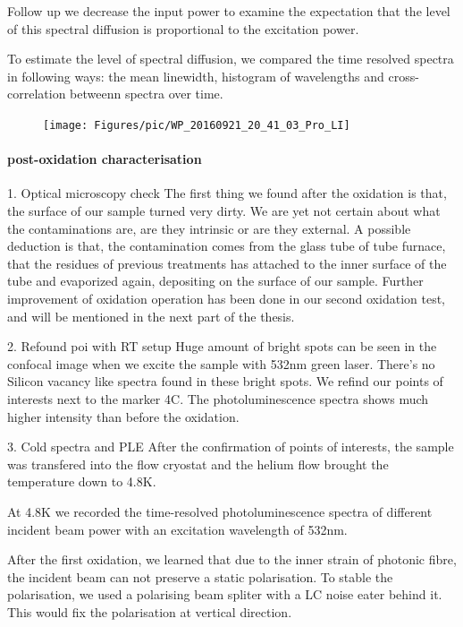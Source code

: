 Follow up we decrease the input power to examine the expectation that the level of this spectral diffusion is proportional to the excitation power.

To estimate the level of spectral diffusion, we compared the time resolved spectra in following ways: the mean linewidth, histogram of wavelengths and cross-correlation betweenn spectra over time.



\FloatBarrier
\begin{figure}[h]
\centering
\texttt{[image: Figures/pic/WP\_20160921\_20\_41\_03\_Pro\_LI]}
\caption{}
\label{fig:wp20160921204103proli}
\end{figure}
\FloatBarrier
\paragraph{post-oxidation characterisation}
1. Optical microscopy check
The first thing we found after the oxidation is that, the surface of our sample turned very dirty. We are yet not certain about what the contaminations are, are they intrinsic or are they external. A possible deduction is that, the contamination comes from the glass tube of tube furnace, that the residues of previous treatments has attached to the inner surface of the tube and evaporized again, depositing on the surface of our sample. Further improvement of oxidation operation has been done in our second oxidation test, and will be mentioned in the next part of the thesis.


2. Refound poi with RT setup
Huge amount of bright spots can be seen in the confocal image when we excite the sample with 532nm green laser. There's no Silicon vacancy like spectra found in these bright spots. We refind our points of interests next to the marker 4C. The photoluminescence spectra shows much higher intensity than before the oxidation.


3. Cold spectra and PLE 
After the confirmation of points of interests, the sample was transfered into the flow cryostat and the helium flow brought the temperature down to 4.8K.

At 4.8K we recorded the time-resolved photoluminescence spectra of different incident beam power with an excitation wavelength of 532nm. 

After the first oxidation, we learned that due to the inner strain of photonic fibre, the incident beam can not preserve a static polarisation. To stable the polarisation, we used a polarising beam spliter with a LC noise eater behind it. This would fix the polarisation at vertical direction.

